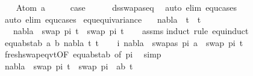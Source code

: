 \begin{isabellebody}
\isanewline
\ \ \isamarkupfalse%
\ {\isacharparenleft}{\kern0pt}Atom\ a{\isacharparenright}{\kern0pt}\isanewline
\ \ \isamarkupfalse%
\ \isamarkupfalse%
\ {\isacharquery}{\kern0pt}case\isanewline
\ \ \ \ \isamarkupfalse%
\ ds{\isacharunderscore}{\kern0pt}swapas{\isacharunderscore}{\kern0pt}eq\ \isamarkupfalse%
\ {\isacharparenleft}{\kern0pt}auto\ elim{\isacharcolon}{\kern0pt}\ equ{\isachardot}{\kern0pt}cases{\isacharparenright}{\kern0pt}\isanewline
{}\isamarkupfalse%
\ {\isacharparenleft}{\kern0pt}auto\ elim{\isacharcolon}{\kern0pt}\ equ{\isachardot}{\kern0pt}cases{\isacharparenright}{\kern0pt}%
\endisatagproof
{\isafoldproof}%
%
\isadelimproof
\isanewline
%
\endisadelimproof
\isanewline
\isanewline
{}\isamarkupfalse%
\ equ{\isacharunderscore}{\kern0pt}equivariance{\isacharcolon}{\kern0pt}\isanewline
\ \ \ {\isachardoublequoteopen}nabla\ {\isasymturnstile}\ t{}\ {\isasymapprox}\ t{}{\isachardoublequoteclose}\isanewline
\ \ \ {\isachardoublequoteopen}nabla\ {\isasymturnstile}\ swap\ pi\ t{}\ {\isasymapprox}\ swap\ pi\ t{}{\isachardoublequoteclose}\isanewline
%
\isadelimproof
\ \ %
\endisadelimproof
%
\isatagproof
{}\isamarkupfalse%
\ assms\isanewline
{}\isamarkupfalse%
{\isacharparenleft}{\kern0pt}induct\ rule{\isacharcolon}{\kern0pt}\ equ{\isachardot}{\kern0pt}induct{\isacharparenright}{\kern0pt}\isanewline
\ \ \isamarkupfalse%
\ {\isacharparenleft}{\kern0pt}equ{\isacharunderscore}{\kern0pt}abst{\isacharunderscore}{\kern0pt}ab\ a\ b\ nabla\ t{}{\isacharprime}{\kern0pt}\ t{}{\isacharprime}{\kern0pt}{\isacharparenright}{\kern0pt}\isanewline
\ \ \isamarkupfalse%
\ i{\isacharcolon}{\kern0pt}\ {\isachardoublequoteopen}nabla\ {\isasymturnstile}\ swapas\ pi\ a\ {\isasymsharp}\ swap\ pi\ t{}{\isacharprime}{\kern0pt}{\isachardoublequoteclose}\isanewline
\ \ \ \ \isamarkupfalse%
\ fresh{\isacharunderscore}{\kern0pt}swap{\isacharunderscore}{\kern0pt}eqvt{\isacharbrackleft}{\kern0pt}OF\ equ{\isacharunderscore}{\kern0pt}abst{\isacharunderscore}{\kern0pt}ab{\isacharparenleft}{\kern0pt}{}{\isacharparenright}{\kern0pt}{\isacharcomma}{\kern0pt}\ of\ pi{\isacharbrackright}{\kern0pt}\ \isamarkupfalse%
\ simp\isanewline
\isanewline
\ \ \isamarkupfalse%
\ {\isachardoublequoteopen}nabla\ {\isasymturnstile}\ swap\ pi\ t{}{\isacharprime}{\kern0pt}\ {\isasymapprox}\ swap\ {\isacharparenleft}{\kern0pt}pi\ {\isacharat}{\kern0pt}\ {\isacharbrackleft}{\kern0pt}{\isacharparenleft}{\kern0pt}a{\isacharcomma}{\kern0pt}b{\isacharparenright}{\kern0pt}{\isacharbrackright}{\kern0pt}{\isacharparenright}{\kern0pt}\ t{}{\isacharprime}{\kern0pt}{\isachardoublequoteclose}\isanewline

\end{isabellebody}

